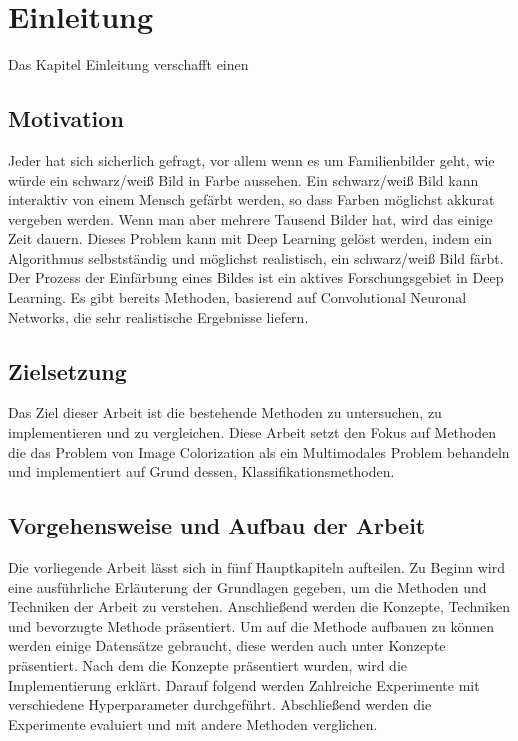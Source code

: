 \chapter{Einleitung}
Das Kapitel Einleitung verschafft einen

\section{Motivation}
Jeder hat sich sicherlich gefragt, vor allem wenn es um Familienbilder geht, wie
würde ein schwarz/weiß Bild in Farbe aussehen. Ein schwarz/weiß Bild kann
interaktiv von einem Mensch gefärbt werden, so dass Farben möglichst akkurat
vergeben werden. Wenn man aber mehrere Tausend Bilder hat, wird das einige
Zeit dauern. Dieses Problem kann mit Deep Learning gelöst werden, indem
ein Algorithmus selbstständig und möglichst realistisch, ein schwarz/weiß Bild
färbt. Der Prozess der Einfärbung eines Bildes ist ein aktives Forschungsgebiet
in Deep Learning. Es gibt bereits Methoden, basierend auf Convolutional
Neuronal Networks, die sehr realistische Ergebnisse liefern.

\section{Zielsetzung}
Das Ziel dieser Arbeit ist die bestehende Methoden zu untersuchen, zu implementieren und zu vergleichen. Diese Arbeit setzt den Fokus
auf Methoden die das Problem von Image Colorization als ein Multimodales Problem behandeln und implementiert auf Grund dessen, 
Klassifikationsmethoden.

\section{Vorgehensweise und Aufbau der Arbeit}
Die vorliegende Arbeit lässt sich in fünf Hauptkapiteln aufteilen. Zu Beginn wird eine ausführliche Erläuterung der Grundlagen gegeben,
um die Methoden und Techniken der Arbeit zu verstehen. Anschließend werden die Konzepte, Techniken und bevorzugte Methode präsentiert.
Um auf die Methode aufbauen zu können werden einige Datensätze gebraucht, diese werden auch unter Konzepte präsentiert.
Nach dem die Konzepte präsentiert wurden, wird die Implementierung erklärt. Darauf folgend werden Zahlreiche Experimente mit verschiedene
Hyperparameter durchgeführt. Abschließend werden die Experimente evaluiert und mit andere Methoden verglichen.